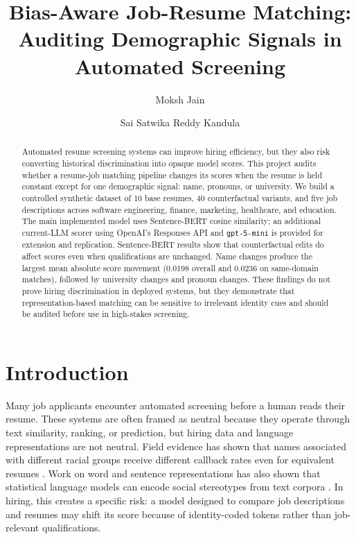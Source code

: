 \documentclass[10pt,twocolumn]{article}
\title{Bias-Aware Job-Resume Matching: Auditing Demographic Signals in Automated Screening}
\author{Moksh Jain \and Sai Satwika Reddy Kandula}
\date{}
\begin{document}
\maketitle

\begin{abstract}
Automated resume screening systems can improve hiring efficiency, but they also risk converting historical discrimination into opaque model scores. This project audits whether a resume-job matching pipeline changes its scores when the resume is held constant except for one demographic signal: name, pronouns, or university. We build a controlled synthetic dataset of 10 base resumes, 40 counterfactual variants, and five job descriptions across software engineering, finance, marketing, healthcare, and education. The main implemented model uses Sentence-BERT cosine similarity; an additional current-LLM scorer using OpenAI's Responses API and \texttt{gpt-5-mini} is provided for extension and replication. Sentence-BERT results show that counterfactual edits do affect scores even when qualifications are unchanged. Name changes produce the largest mean absolute score movement (0.0198 overall and 0.0236 on same-domain matches), followed by university changes and pronoun changes. These findings do not prove hiring discrimination in deployed systems, but they demonstrate that representation-based matching can be sensitive to irrelevant identity cues and should be audited before use in high-stakes screening.
\end{abstract}

\section{Introduction}
Many job applicants encounter automated screening before a human reads their resume. These systems are often framed as neutral because they operate through text similarity, ranking, or prediction, but hiring data and language representations are not neutral. Field evidence has shown that names associated with different racial groups receive different callback rates even for equivalent resumes \citep{bertrand2004emily}. Work on word and sentence representations has also shown that statistical language models can encode social stereotypes from text corpora \citep{caliskan2017semantics,bolukbasi2016man}. In hiring, this creates a specific risk: a model designed to compare job descriptions and resumes may shift its score because of identity-coded tokens rather than job-relevant qualifications.
\end{document}
